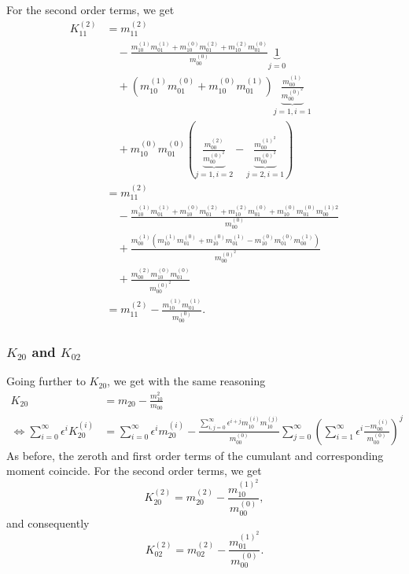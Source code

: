 For the second order terms, we get
\begin{equation}
  \begin{aligned}
    K_{11}^{(2)}
    &= m_{11}^{(2)} \\
    &\quad-
    \frac{
      m_{10}^{(1)}m_{01}^{(1)}
    + m_{10}^{(0)}m_{01}^{(2)}
    + m_{10}^{(2)}m_{01}^{(0)}
    }{m_{00}^{(0)}}\underbrace{1}_{j=0}\\
    &\quad
    +(m_{10}^{(1)}m_{01}^{(0)} + m_{10}^{(0)}m_{01}^{(1)})\underbrace{ \frac{m_{00}^{(1)}}{m_{00}^{{(0)}^2}}}_{j=1,i=1}\\
    &\quad
    + m_{10}^{(0)}m_{01}^{(0)}
    \left(
      \underbrace{\frac{m_{00}^{(2)}}{{m_{00}^{{(0)}^2}}}}_{j=1,i=2}
      - \underbrace{\frac{m_{00}^{{(1)}^2}}{m_{00}^{{(0)}^2}}}_{j=2,i=1}
    \right)\\
    &= m_{11}^{(2)} \\
    &\quad-
    \frac{
      m_{10}^{(1)}m_{01}^{(1)}
    + m_{10}^{(0)}m_{01}^{(2)}
    + m_{10}^{(2)}m_{01}^{(0)}
    + m_{10}^{(0)}m_{01}^{(0)}m_{00}^{(1)2}
    }{m_{00}^{(0)}}\\
    &\quad
    + \frac{m_{00}^{(1)}(m_{10}^{(1)}m_{01}^{(0)} + m_{10}^{(0)}m_{01}^{(1)} - m_{10}^{(0)}m_{01}^{(0)}m_{00}^{(1)})}{m_{00}^{{(0)}^2}}  \\
    &\quad
    + \frac{m_{00}^{(2)}m_{10}^{(0)}m_{01}^{(0)}}{m_{00}^{{(0)}^2}} \\
    & = m_{11}^{(2)}
    - \frac{ m_{10}^{(1)}m_{01}^{(1)}}{m_{00}^{(0)}}.
  \end{aligned}
\end{equation}

\subsubsection{\texorpdfstring{$K_{20}$}{K 20} and \texorpdfstring{$K_{02}$}{K 02}}
\label{subs:K 20}
Going further to $K_{20}$, we get with the same reasoning
\begin{equation}
  \begin{aligned}
    K_{20} & = m_{20} - \frac{m_{10}^2}{m_{00}}\\
    \Leftrightarrow
    \sum_{i=0}^\infty \epsilon^i K_{20}^{(i)}
    & = \sum_{i=0}^\infty \epsilon^i m_{20}^{(i)} -
    \frac{\sum_{i,j=0}^\infty \epsilon^{i+j} m_{10}^{(i)}m_{10}^{(j)}}
        {m_{00}^{(0)}}
    \sum_{j=0}^\infty {\left(\sum_{i=1}^\infty \epsilon^i \frac{ - m_{00}^{(i)}}{ m_{00}^{(0)}}\right)}^j
  \end{aligned}
\end{equation}
As before, the zeroth and first order terms of the cumulant and corresponding moment coincide.
For the second order terms, we get
\begin{equation}
  K_{20}^{(2)} = m_{20}^{(2)}
  - \frac{ m_{10}^{{(1)}^2}}{m_{00}^{(0)}},
\end{equation}
and consequently
\begin{equation}
  K_{02}^{(2)} = m_{02}^{(2)}
  - \frac{ m_{01}^{{(1)}^2}}{m_{00}^{(0)}}.
\end{equation}

